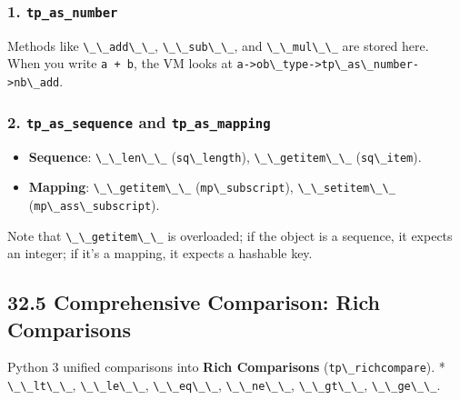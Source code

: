 \hypertarget{tp_as_number}{%
\subsubsection{\texorpdfstring{1.
\texttt{tp\_as\_number}}{1. tp\_as\_number}}\label{tp_as_number}}

Methods like \passthrough{\lstinline!\_\_add\_\_!},
\passthrough{\lstinline!\_\_sub\_\_!}, and
\passthrough{\lstinline!\_\_mul\_\_!} are stored here. When you write
\passthrough{\lstinline!a + b!}, the VM looks at
\passthrough{\lstinline!a->ob\_type->tp\_as\_number->nb\_add!}.

\hypertarget{tp_as_sequence-and-tp_as_mapping}{%
\subsubsection{\texorpdfstring{2. \texttt{tp\_as\_sequence} and
\texttt{tp\_as\_mapping}}{2. tp\_as\_sequence and tp\_as\_mapping}}\label{tp_as_sequence-and-tp_as_mapping}}

\begin{itemize}
\tightlist
\item
  \textbf{Sequence}: \passthrough{\lstinline!\_\_len\_\_!}
  (\passthrough{\lstinline!sq\_length!}),
  \passthrough{\lstinline!\_\_getitem\_\_!}
  (\passthrough{\lstinline!sq\_item!}).
\item
  \textbf{Mapping}: \passthrough{\lstinline!\_\_getitem\_\_!}
  (\passthrough{\lstinline!mp\_subscript!}),
  \passthrough{\lstinline!\_\_setitem\_\_!}
  (\passthrough{\lstinline!mp\_ass\_subscript!}).
\end{itemize}

Note that \passthrough{\lstinline!\_\_getitem\_\_!} is overloaded; if
the object is a sequence, it expects an integer; if it's a mapping, it
expects a hashable key.

\hypertarget{comprehensive-comparison-rich-comparisons}{%
\subsection{32.5 Comprehensive Comparison: Rich
Comparisons}\label{comprehensive-comparison-rich-comparisons}}

Python 3 unified comparisons into \textbf{Rich Comparisons}
(\passthrough{\lstinline!tp\_richcompare!}). *
\passthrough{\lstinline!\_\_lt\_\_!},
\passthrough{\lstinline!\_\_le\_\_!},
\passthrough{\lstinline!\_\_eq\_\_!},
\passthrough{\lstinline!\_\_ne\_\_!},
\passthrough{\lstinline!\_\_gt\_\_!},
\passthrough{\lstinline!\_\_ge\_\_!}.


